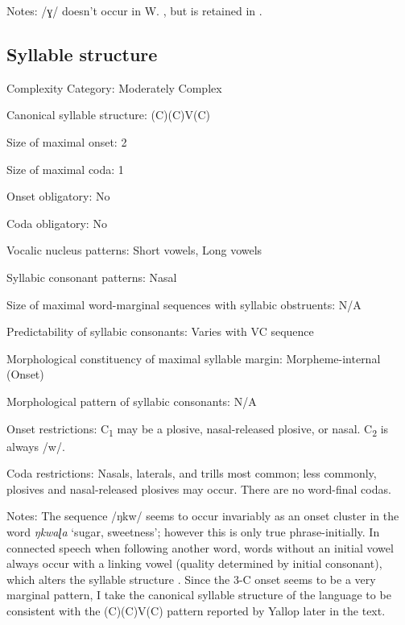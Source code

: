 {\begin{appendixdesc}
\item[Notes:] /ɣ/ doesn’t occur in W. , but is retained in  \citep[12]{Yallop1977}.
\end{appendixdesc}
\subsection*{Syllable structure}
\begin{appendixdesc}

\item[Complexity Category:] Moderately Complex

\item[Canonical syllable structure:] (C)(C)V(C) \citep[41--45]{Yallop1977}

\item[Size of maximal onset:] 2

\item[Size of maximal coda:] 1

\item[Onset obligatory:] No

\item[Coda obligatory:] No

\item[Vocalic nucleus patterns:] Short vowels, Long vowels

\item[Syllabic consonant patterns:] Nasal

\item[Size of maximal word-marginal sequences with syllabic obstruents:] N/A

\item[Predictability of syllabic consonants:] Varies with VC sequence

\item[Morphological constituency of maximal syllable margin:] Morpheme-internal (Onset)

\item[Morphological pattern of syllabic consonants:] N/A

\item[Onset restrictions:] C\textsubscript{1} may be a plosive, nasal-released plosive, or nasal. C\textsubscript{2} is always /w/.

\item[Coda restrictions:] Nasals, laterals, and trills most common; less commonly, plosives and nasal-released plosives may occur. There are no word-final codas.

\item[Notes:] The sequence /ŋkw/ seems to occur invariably as an onset cluster in the word \textit{ŋkwaɭa} ‘sugar, sweetness’; however this is only true phrase-initially. In connected speech when following another word, words without an initial vowel always occur with a linking vowel (quality determined by initial consonant), which alters the syllable structure \citep[28--30]{Yallop1977}. Since the 3-C onset seems to be a very marginal pattern, I take the canonical syllable structure of the language to be consistent with the (C)(C)V(C) pattern reported by Yallop later in the text.
\end{appendixdesc}
}
